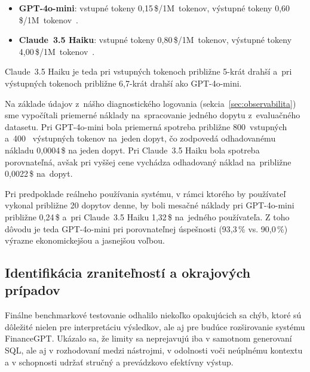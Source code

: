 \begin{itemize}
	\item \textbf{GPT-4o-mini}: vstupné tokeny 0,15\,\$/1M~tokenov, výstupné
		tokeny 0,60\,\$/1M~tokenov~\cite{openrouter2024gpt4omini}.

	\item \textbf{Claude~3.5 Haiku}: vstupné tokeny 0,80\,\$/1M~tokenov, výstupné
		tokeny 4,00\,\$/1M~tokenov~\cite{openrouter2024claude35haiku}.
\end{itemize}

Claude~3.5 Haiku je teda pri vstupných tokenoch približne 5-krát drahší a~pri výstupných
tokenoch približne 6,7-krát drahší ako GPT-4o-mini.

Na základe údajov z~nášho diagnostického logovania (sekcia~\ref{sec:observabilita})
sme vypočítali priemerné náklady na~spracovanie jedného dopytu z~evaluačného datasetu.
Pri GPT-4o-mini bola priemerná spotreba približne 800~vstupných a~400~ výstupných
tokenov na~jeden dopyt, čo zodpovedá odhadovanému nákladu 0,0004\,\$ na jeden
dopyt. Pri Claude~3.5 Haiku bola spotreba porovnateľná, avšak pri vyššej cene
vychádza odhadovaný náklad na~približne 0,0022\,\$ na~dopyt.


Pri predpoklade reálneho používania systému, v rámci ktorého by používateľ
vykonal približne 20 dopytov denne, by boli mesačné náklady pri GPT-4o-mini približne
0,24\,\$ a~pri Claude~3.5 Haiku 1,32\,\$ na~jedného používateľa. Z toho dôvodu
je teda GPT-4o-mini pri porovnateľnej úspešnosti (93,3\,\% vs. 90,0\,\%) výrazne ekonomickejšou
a jasnejšou voľbou.

\subsection{Identifikácia zraniteľností a okrajových prípadov}

Finálne benchmarkové testovanie odhalilo niekoľko opakujúcich sa chýb, ktoré sú dôležité
nielen pre interpretáciu výsledkov, ale aj pre budúce rozširovanie systému
FinanceGPT. Ukázalo sa, že limity sa neprejavujú iba v samotnom generovaní SQL, ale
aj v rozhodovaní medzi nástrojmi, v odolnosti voči neúplnému kontextu a v
schopnosti udržať stručný a prevádzkovo efektívny výstup.


